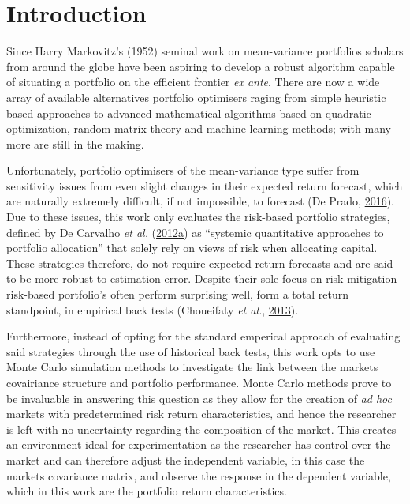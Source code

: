 \documentclass[11pt,preprint, authoryear]{elsarticle}
\numberwithin{equation}{section}
\numberwithin{figure}{section}
\numberwithin{table}{section}
\begin{document}
\hypertarget{introduction}{%
\section{\texorpdfstring{Introduction
\label{Introduction}}{Introduction }}\label{introduction}}

Since Harry Markovitz's (1952) seminal work on mean-variance portfolios
scholars from around the globe have been aspiring to develop a robust
algorithm capable of situating a portfolio on the efficient frontier
\emph{ex ante}. There are now a wide array of available alternatives
portfolio optimisers raging from simple heuristic based approaches to
advanced mathematical algorithms based on quadratic optimization, random
matrix theory and machine learning methods; with many more are still in
the making.

Unfortunately, portfolio optimisers of the mean-variance type suffer
from sensitivity issues from even slight changes in their expected
return forecast, which are naturally extremely difficult, if not
impossible, to forecast (De Prado, \protect\hyperlink{ref-lopez}{2016}).
Due to these issues, this work only evaluates the risk-based portfolio
strategies, defined by De Carvalho \emph{et al.}
(\protect\hyperlink{ref-leote}{2012}\protect\hyperlink{ref-leote}{a}) as
``systemic quantitative approaches to portfolio allocation'' that solely
rely on views of risk when allocating capital. These strategies
therefore, do not require expected return forecasts and are said to be
more robust to estimation error. Despite their sole focus on risk
mitigation risk-based portfolio's often perform surprising well, form a
total return standpoint, in empirical back tests (Choueifaty \emph{et
al.}, \protect\hyperlink{ref-choueifaty2013}{2013}).

Furthermore, instead of opting for the standard emperical approach of
evaluating said strategies through the use of historical back tests,
this work opts to use Monte Carlo simulation methods to investigate the
link between the markets covairiance structure and portfolio
performance. Monte Carlo methods prove to be invaluable in answering
this question as they allow for the creation of \emph{ad hoc} markets
with predetermined risk return characteristics, and hence the researcher
is left with no uncertainty regarding the composition of the market.
This creates an environment ideal for experimentation as the researcher
has control over the market and can therefore adjust the independent
variable, in this case the markets covariance matrix, and observe the
response in the dependent variable, which in this work are the portfolio
return characteristics.
\end{document}
